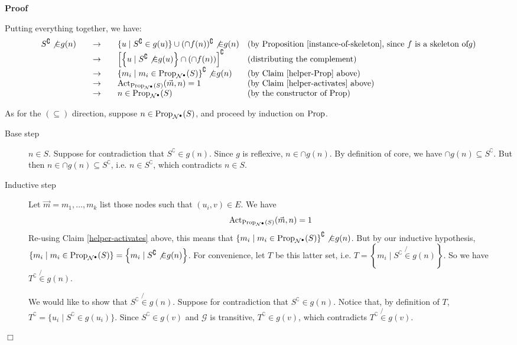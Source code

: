 \documentclass{article}
\newcommand{\tmop}[1]{\ensuremath{\operatorname{#1}}}
\newenvironment{proof}{\noindent\textbf{Proof\ }}{\hspace*{\fill}$\Box$\medskip}
\newcommand{\Net}{\ensuremath{\mathcal{N}}}
\newcommand{\Prop}{\textsf{\tmop{Prop}}}
\newcommand{\Activ}{\textsf{\tmop{Act}}}
\begin{document}
\begin{proof}
\begin{description}
    Putting everything together, we have:
    \[ \begin{array}{llll}
         S^{\complement} \not{\in} g (n) & \quad \rightarrow \quad & \{ u \mid
         S^{\complement} \in g (u) \} \cup (\cap f (n))^{\complement}
         \not{\in} g (n) & \text{(by Proposition \ref{instance-of-skeleton},
         since } f \text{ is a skeleton of} g \text{)}\\
         & \quad \rightarrow \quad & \left[ \left\{ u \mid S^{\complement}
         \not{\in} g (u) \right\} \cap (\cap f (n)) \right]^{\complement} &
         \text{(distributing the complement)}\\
         & \quad \rightarrow \quad & \left\{ m_i \mid m_i \in
         \Prop_{\Net^{\bullet}} (S) \right\}^{\complement} \not{\in} g (n) &
         \text{(by Claim \ref{helper-Prop} above)}\\
         & \quad \rightarrow \quad & \Activ_{\Prop_{\Net^{\bullet}} (S)}
         (\vec{m}, n) = 1 & \text{(by Claim \ref{helper-activates} above)}\\
         & \quad \rightarrow \quad & n \in \Prop_{\Net^{\bullet}} (S) &
         \text{(by the constructor of } \Prop \text{)}
       \end{array} \]
  \end{description}
  As for the $(\subseteq)$ direction, suppose $n \in \Prop_{\Net^{\bullet}}
  (S)$, and proceed by induction on $\Prop$.
  \begin{description}
    \item[Base step] $n \in S$. Suppose for contradiction that
    $S^{\complement} \in g (n)$. Since $g$ is reflexive, $n \in \cap g (n)$.
    By definition of core, we have $\cap g (n) \subseteq S^{\complement}$. But
    then $n \in \cap g (n) \subseteq S^{\complement}$, i.e. $n \in
    S^{\complement}$, which contradicts $n \in S$.
    
    \item[Inductive step] Let $\vec{m} = m_1, \ldots, m_k$ list those nodes
    such that $(u_i, v) \in E$. We have
    \[ \Activ_{\Prop_{\Net^{\bullet}} (S)} (\vec{m}, n) = 1 \]
    Re-using Claim \ref{helper-activates} above, this means that $\left\{ m_i
    \mid m_i \in \Prop_{\Net^{\bullet}} (S) \right\}^{\complement} \not{\in} g
    (n)$. But by our inductive hypothesis, $\left\{ m_i \mid m_i \in
    \Prop_{\Net^{\bullet}} (S) \right\} = \left\{ m_i \mid S^{\complement}
    \not{\in} g (n) \right\}$. For convenience, let $T$ be this latter set,
    i.e. $T = \left\{ m_i \mid S^{\complement} \not{\in} g (n) \right\}$. So
    we have $T^{\complement} \not{\in} g (n)$.
    
    We would like to show that $S^{\complement} \not{\in} g (n)$. Suppose for
    contradiction that $S^{\complement} \in g (n)$. Notice that, by definition
    of $T$, $T^{\complement} = \{ u_i \mid S^{\complement} \in g (u_i) \}$.
    Since $S^{\complement} \in g (v)$ and $\mathcal{G}$ is transitive,
    $T^{\complement} \in g (v)$, which contradicts $T^{\complement} \not{\in}
    g (v)$.
  \end{description}
  
\end{proof}
\end{document}
